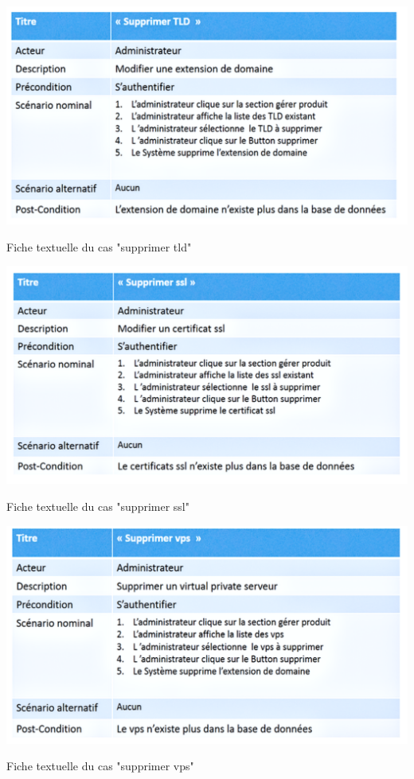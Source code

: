 \documentclass[a4paper, 12pt]{report}
\begin{document}
\begin{table}[H]
	\centering
	\includegraphics{img/fiche/21}
	\caption{Fiche textuelle du cas "supprimer tld"}
	\label{Tux}
\end{table}
\begin{table}[H]
	\centering
	\includegraphics{img/fiche/22}
	\caption{Fiche textuelle du cas "supprimer ssl"}
	\label{Tux}
\end{table}
\begin{table}[H]
	\centering
	\includegraphics{img/fiche/23}
	\caption{Fiche textuelle du cas "supprimer vps" }
	\label{Tux}
\end{table}
\end{document}
